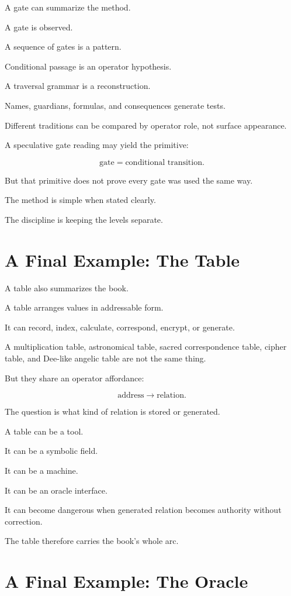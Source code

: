 \documentclass[11pt]{book}
\begin{document}
A gate can summarize the method.

A gate is observed.

A sequence of gates is a pattern.

Conditional passage is an operator hypothesis.

A traversal grammar is a reconstruction.

Names, guardians, formulas, and consequences generate tests.

Different traditions can be compared by operator role, not surface appearance.

A speculative gate reading may yield the primitive:

\[
\text{gate} = \text{conditional transition}.
\]

But that primitive does not prove every gate was used the same way.

The method is simple when stated clearly.

The discipline is keeping the levels separate.

\section{A Final Example: The Table}

A table also summarizes the book.

A table arranges values in addressable form.

It can record, index, calculate, correspond, encrypt, or generate.

A multiplication table, astronomical table, sacred correspondence table, cipher table, and Dee-like angelic table are not the same thing.

But they share an operator affordance:

\[
\text{address} \rightarrow \text{relation}.
\]

The question is what kind of relation is stored or generated.

A table can be a tool.

It can be a symbolic field.

It can be a machine.

It can be an oracle interface.

It can become dangerous when generated relation becomes authority without correction.

The table therefore carries the book's whole arc.

\section{A Final Example: The Oracle}
\end{document}
